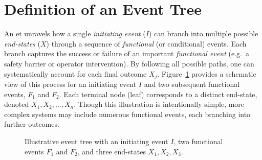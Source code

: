 \section{Definition of an Event Tree}
\label{sec:event_tree_definition}

An \acrfull{et} unravels how a single \emph{initiating event} (\(I\)) can branch into multiple possible \emph{end-states} (\(X\)) through a sequence of \emph{functional} (or conditional) events. Each branch captures the success or failure of an important \emph{functional event} (e.g.\ a safety barrier or operator intervention). By following all possible paths, one can systematically account for each final outcome \(X_j\). Figure~\ref{fig:event_tree_example} provides a schematic view of this process for an initiating event \(I\) and two subsequent functional events, \(F_1\) and \(F_2\). Each terminal node (leaf) corresponds to a distinct end-state, denoted \(X_1, X_2, \ldots, X_n\). Though this illustration is intentionally simple, more complex systems may include numerous functional events, each branching into further outcomes.

\begin{figure}[ht!]
\centering
{}
\caption{Illustrative event tree with an initiating event \(I\), two functional events \(F_1\) and \(F_2\), and three end-states \(X_1, X_2, X_3\).}
\label{fig:event_tree_example}
\end{figure}

